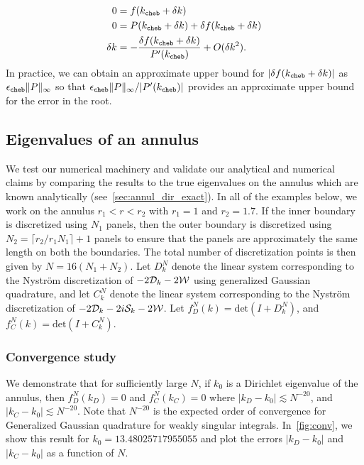 \begin{align*}
  0 &= f(k_{\texttt{cheb}} + \delta k) \\
  0 &= P(k_{\texttt{cheb}} + \delta k) + \delta f(k_{\texttt{cheb}} + \delta k) \\
  \delta k &= -\frac{\delta f(k_{\texttt{cheb}} + \delta k)}{P'(k_{\texttt{cheb}})} + O(\delta k^2) .
\end{align*}
In practice, we can obtain an approximate upper
bound for $|\delta f(k_{\texttt{cheb}}+\delta k)|$
as ${\epsilon_{\texttt{cheb}}} \|P\|_\infty$ so that ${\epsilon_{\texttt{cheb}}} \|P\|_\infty/
|P'(k_{\texttt{cheb}})|$ provides an approximate upper bound
for the error in the root.

\subsection{Eigenvalues of an annulus}
We test our numerical machinery and validate our analytical 
and numerical claims
by comparing the results to the true eigenvalues on the annulus
which are known analytically (see~\cref{sec:annul_dir_exact}).
In all of the examples below, we work on the annulus $r_{1}<r<r_{2}$
with $r_{1} = 1$ and $r_{2} = 1.7$.
If the inner boundary is discretized using $N_{1}$ panels, 
then the outer boundary is discretized using $N_{2} = 
\lceil r_{2}/r_{1} N_{1} \rceil +1$ panels to ensure that the
panels are approximately the same length on both the boundaries. 
The total number of discretization points 
is then given by $N = 16(N_{1} + N_{2})$.
Let $D^{N}_{k}$ denote the linear system corresponding
to the Nystr\"{o}m discretization of
$-2{\mathcal D}_{k} -2{\mathcal W}$ using generalized Gaussian quadrature, 
and let $C^{N}_{k}$ denote the linear system corresponding
to the Nystr\"{o}m discretization of 
$-2{\mathcal D}_{k} - 2i{\mathcal S}_{k} -2{\mathcal W}$.
Let $f_{D}^{N}(k) = \text{det}(I+D^{N}_{k})$, and 
$f_{C}^{N}(k) = \text{det}(I+C^{N}_{k})$.

\subsubsection{Convergence study}
\label{subsec:convannulus}
We demonstrate that 
for sufficiently large $N$, if $k_{0}$ is a Dirichlet 
eigenvalue of the annulus, 
then $f_{D}^{N}(k_{D}) = 0$ and $f_{C}^{N}(k_{C}) = 0$
where $|k_{D} - k_{0}| \lesssim N^{-20}$, 
and $|k_{C} - k_{0}| \lesssim N^{-20}$.
Note that $N^{-20}$ is the expected order of
convergence for Generalized Gaussian quadrature for weakly 
singular integrals.
In~\cref{fig:conv}, we show this result for $k_{0} = 13.48025717955055$
and plot the errors $|k_{D}-k_{0}|$ and $|k_{C}-k_{0}|$ as a function
of $N$. 

